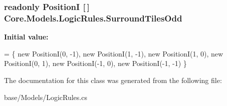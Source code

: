 \hypertarget{classCore_1_1Models_1_1LogicRules_ae559d0e04d49b4cea7874d1e7ca5a5b2}{
\subsubsection[{Surround\-Tiles\-Odd}]{\setlength{\rightskip}{0pt plus 5cm}readonly {\bf Position\-I} \mbox{[}$\,$\mbox{]} Core.\-Models.\-Logic\-Rules.\-Surround\-Tiles\-Odd\hspace{0.3cm}{\ttfamily [static]}}}\label{classCore_1_1Models_1_1LogicRules_ae559d0e04d49b4cea7874d1e7ca5a5b2}
{\bfseries Initial value\-:}
\begin{DoxyCode}
=
            \{
                \textcolor{keyword}{new} PositionI(0, -1),
                \textcolor{keyword}{new} PositionI(1, -1),
                \textcolor{keyword}{new} PositionI(1, 0),
                \textcolor{keyword}{new} PositionI(0, 1),
                \textcolor{keyword}{new} PositionI(-1, 0),
                \textcolor{keyword}{new} PositionI(-1, -1)
            \}
\end{DoxyCode}


The documentation for this class was generated from the following file\-:\begin{DoxyCompactItemize}
\item 
base/\-Models/Logic\-Rules.\-cs\end{DoxyCompactItemize}
